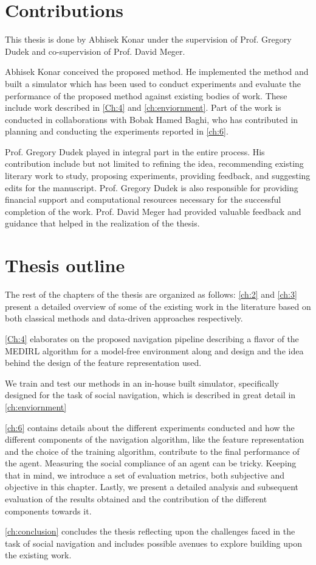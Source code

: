 \section{Contributions}
This thesis is done by Abhisek Konar under the supervision of Prof. Gregory Dudek and co-supervision of Prof. David Meger.  
\par
Abhisek Konar conceived the proposed method. He implemented the method and built a simulator which has been used to conduct experiments and evaluate the performance of the proposed method against existing bodies of work. These include work described in \autoref{Ch:4} and \autoref{ch:enviornment}. Part of the work is conducted in collaborations with Bobak Hamed Baghi, who has contributed in planning and conducting the experiments reported in \autoref{ch:6}.
\par
Prof. Gregory Dudek played in integral part in the entire process. His contribution include but not limited to refining the idea, recommending existing literary work to study, proposing experiments, providing feedback, and suggesting edits for the manuscript. Prof. Gregory Dudek is also responsible for providing financial support and computational resources necessary for the successful completion of the work. Prof. David Meger had provided valuable feedback and guidance that helped in the  realization of the thesis.


\section{Thesis outline}
The rest of the chapters of the thesis are organized as follows:
\autoref{ch:2} and \autoref{ch:3} present a detailed overview of some of the existing work in the literature based on both classical methods and data-driven approaches respectively.

\autoref{Ch:4} elaborates on the proposed navigation pipeline describing a flavor of the MEDIRL algorithm for a model-free environment along and design and the idea behind the design of the feature representation used.

We train and test our methods in an in-house built simulator, specifically designed for the task of social navigation, which is described in great detail in \autoref{ch:enviornment}

\autoref{ch:6} contains details about the different experiments conducted and how the different components of the navigation algorithm, like the feature representation and the choice of the training algorithm, contribute to the final performance of the agent. Measuring the social compliance of an agent can be tricky. Keeping that in mind, we introduce a set of evaluation metrics, both subjective and objective in this chapter. Lastly, we present a detailed analysis and subsequent evaluation of the results obtained and the contribution of the different components towards it.

\autoref{ch:conclusion} concludes the thesis reflecting upon the challenges faced in the task of social navigation and includes possible avenues to explore building upon the existing work.
